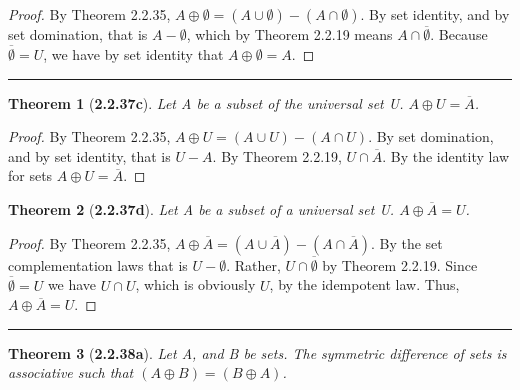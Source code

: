 \documentclass[a4paper, 12pt]{article}
\theoremstyle{plain}
\newtheorem*{theorem*}{Theorem}
\begin{document}
\begin{proof}
    By Theorem 2.2.35, $A \oplus \emptyset = (A \cup \emptyset) - (A \cap \emptyset)$. By set 
    identity, and by set domination, that is $A - \emptyset$, which by Theorem 2.2.19 means 
    $A \cap \overline{\emptyset}$. Because $\overline{\emptyset} = U$, we have by set identity 
    that $A \oplus \emptyset = A$.
\end{proof}
\begin{center}
    \rule{5.4in}{1pt}
\end{center}


\begin{theorem*}[\textbf{2.2.37c}]
    Let A be a subset of the universal set U. $A \oplus U = \overline{A}$.
\end{theorem*}

\begin{proof}
    By Theorem 2.2.35, $A \oplus U = (A \cup U) - (A \cap U)$. By set domination, and by set 
    identity, that is $U - A$. By Theorem 2.2.19, $U \cap \overline{A}$. By the identity law 
    for sets $A \oplus U = \overline{A}$.
\end{proof}

\pagebreak


\begin{theorem*}[\textbf{2.2.37d}]
    Let A be a subset of a universal set U. $A \oplus \overline{A} = U$.
\end{theorem*}

\begin{proof}
    By Theorem 2.2.35, $A \oplus \overline{A} = (A \cup \overline{A}) - (A \cap \overline{A})$. 
    By the set complementation laws that is $U - \emptyset$. Rather, 
    $U \cap \overline{\emptyset}$ by Theorem 2.2.19. Since $\overline{\emptyset} = U$ we have 
    $U \cap U$, which is obviously $U$, by the idempotent law. Thus, 
    $A \oplus \overline{A} = U$.
\end{proof}
\begin{center}
    \rule{5.4in}{1pt}
\end{center}


\begin{theorem*}[\textbf{2.2.38a}]
    Let A, and B be sets. The symmetric difference of sets is associative such that 
    $(A \oplus B) = (B \oplus A)$.
\end{theorem*}
\end{document}
